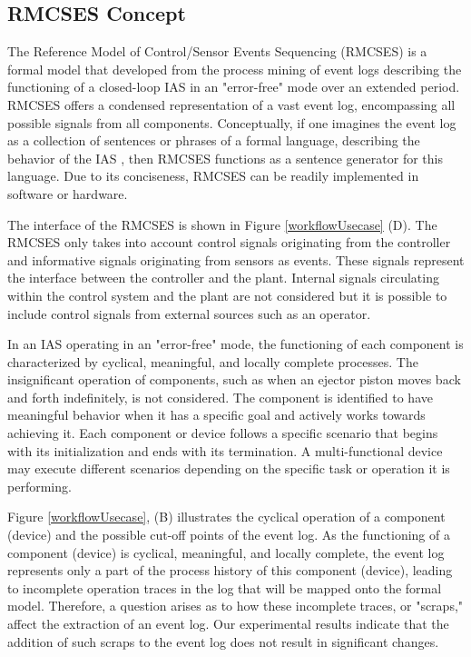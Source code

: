 \documentclass{ieeeojies}
\begin{document}
\subsection{RMCSES Concept}
\label{rmcses}

The Reference Model of Control/Sensor Events Sequencing (RMCSES) is a formal model that developed from the process mining  \cite{cook1998discovering} of event logs describing the functioning of a closed-loop IAS in an "error-free" mode over an extended period. RMCSES offers a condensed representation of a vast event log, encompassing all possible signals from all components. Conceptually, if one imagines the event log as a collection of sentences or phrases of a formal language, describing the behavior of the IAS \cite{sinha2019survey}, then RMCSES functions as a sentence generator for this language. Due to its conciseness, RMCSES can be readily implemented in software or hardware.


The interface of the RMCSES is shown in Figure \ref{workflowUsecase} (D). The RMCSES only takes into account control signals originating from the controller and informative signals originating from sensors as events. These signals represent the interface between the controller and the plant. Internal signals circulating within the control system and the plant are not considered but it is possible to include control signals from external sources such as an operator.




In an IAS operating in an "error-free" mode, the functioning of each component is characterized by cyclical, meaningful, and locally complete processes. The insignificant operation of components, such as when an ejector piston moves back and forth indefinitely, is not considered. The component is identified to have meaningful behavior when it has a specific goal and actively works towards achieving it. Each component or device follows a specific scenario that begins with its initialization and ends with its termination. A multi-functional device may execute different scenarios depending on the specific task or operation it is performing.

Figure \ref{workflowUsecase}, (B) illustrates the cyclical operation of a component (device) and the possible cut-off points of the event log. As the functioning of a component (device) is cyclical, meaningful, and locally complete, the event log represents only a part of the process history of this component (device), leading to incomplete operation traces in the log that will be mapped onto the formal model. Therefore, a question arises as to how these incomplete traces, or "scraps," affect the extraction of an event log. Our experimental results indicate that the addition of such scraps to the event log does not result in significant changes.
\end{document}
